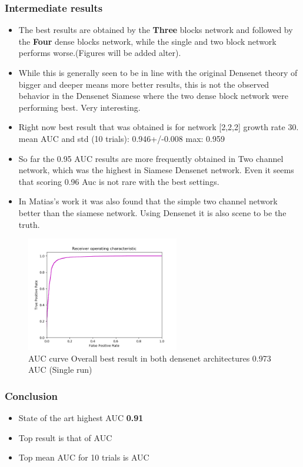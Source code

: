 
\subsubsection{Intermediate results}
\begin{itemize}
 \item The best results are obtained by the \textbf{Three} blocks network and followed by the \textbf{Four} dense blocks network, while the single and two block network performs worse.(Figures will be added alter). 
 \item While this is generally seen to be in line with the original Densenet theory of bigger and deeper means more better results, this is not the observed behavior in the Densenet Siamese where the two dense block network 
 were performing best. Very interesting.
  \item Right now best result that was obtained is for network [2,2,2] growth rate 30. mean AUC and std (10 trials):  0.946+/-0.008  max:   0.959 %
  \item So far the 0.95 AUC results are more frequently obtained in Two channel network, which was the highest in Siamese Densenet network. Even it seems that scoring 0.96 Auc is not rare with the best settings.
 \item In Matias's work it was also found that the simple two channel network better than the siamese network. Using Densenet it is also scene to be the truth.
\end{itemize}

\begin{figure}[ht]
\centering
\includegraphics[height= 5cm]{images/densenet/densenet_two_channel_ninetysevenAUC}
\caption{AUC curve Overall best result in both densenet architectures 0.973 AUC (Single run)}
\label{fig:densenet_two_channel_ninetysevenAUC}
\end{figure}

\subsubsection{Conclusion}
\begin{itemize}
 \item State of the art highest AUC \textbf{0.91}
 \item Top result is that of  AUC
 \item Top mean AUC for 10 trials is AUC
\end{itemize}
